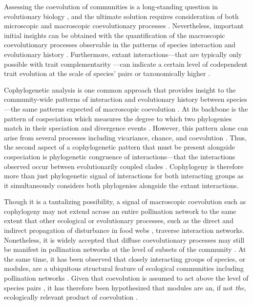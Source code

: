 \documentclass{article}
\begin{document}
	Assessing the coevolution of communities is a long-standing question in evolutionary biology \citep{Futuyma1983, Thompson2005, Bascompte2014}, and the ultimate solution requires consideration of both microscopic and macroscopic coevolutionary processes \citep{Thompson2005, Anderson2015}. Nevertheless, important initial insights can be obtained with the quantification of the macroscopic coevolutionary processes observable in the patterns of species interaction and evolutionary history \citep{Futuyma1983, Page2003}. Furthermore, extant interactions---that are typically only possible with trait complementarity \citep{Thompson2005, Segraves2010}---can indicate a certain level of codependent trait evolution at the scale of species' pairs or taxonomically higher \citep{Futuyma1983, Page2003}.  
	
	Cophylogenetic analysis is one common approach that provides insight to the community-wide patterns of interaction and evolutionary history between species---the same patterns expected of macroscopic coevolution \citep{Futuyma1983, Balbuena2013}. At its backbone is the pattern of cospeciation which measures the degree to which two phylogenies match in their speciation and divergence events \citep{Page2003, Clayton2004}. However, this pattern alone can arise from several processes including vicariance, chance, and coevolution \citep{Page2003, Thompson2005, Anderson2015}. Thus, the second aspect of a cophylogenetic pattern that must be present alongside cospeciation is phylogenetic congruence of interactions---that the interactions observed occur between evolutionarily coupled clades \citep{Legendre2002, Balbuena2013}. Cophylogeny is therefore more than just phylogenetic signal of interactions for both interacting groups as it simultaneously considers both phylogenies alongside the extant interactions. 
	
	Though it is a tantalizing possibility, a signal of macroscopic coevolution such as cophylogeny may not extend across an entire pollination network to the same extent that other ecological or evolutionary processes, such as the direct and indirect propagation of disturbance in food webs \citep{Stouffer2011}, traverse interaction networks. Nonetheless, it is widely accepted that diffuse coevolutionary processes may still be manifest in pollination networks at the level of subsets of the community \citep{Thompson2005, Olesen2007, Bascompte2014}. At the same time, it has been observed that closely interacting groups of species, or modules, are a ubiquitous structural feature of ecological communities including pollination networks \citep{Olesen2007, Guimera2010}. Given that coevolution is assumed to act above the level of species pairs \citep{Fox1988, Thompson2005}, it has therefore been hypothesized that modules are an, if not \emph{the}, ecologically relevant product of coevolution \citep{Olesen2007, Bascompte2015}. 
\end{document}
